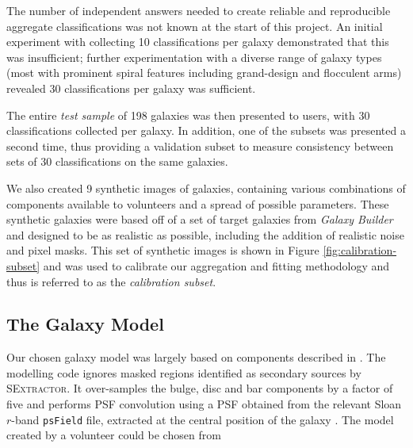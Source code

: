 \documentclass[main\.tex]{subfiles}
\begin{document}
The number of independent answers needed to create reliable and reproducible aggregate classifications was not known at the start of this project. An initial experiment with collecting 10 classifications per galaxy demonstrated that this was insufficient; further experimentation with a diverse range of galaxy types (most with prominent spiral features including grand-design and flocculent arms) revealed 30 classifications per galaxy was sufficient.

The entire {\it test sample} of 198 galaxies was then presented to users, with 30 classifications collected per galaxy. In addition, one of the subsets was presented a second time, thus providing a validation subset to measure consistency between sets of 30 classifications on the same galaxies.

We also created 9 synthetic images of galaxies, containing various combinations of components available to volunteers and a spread of possible parameters. These synthetic galaxies were based off of a set of target galaxies from \textit{Galaxy Builder} and designed to be as realistic as possible, including the addition of realistic noise and pixel masks. This set of synthetic images is shown in Figure \ref{fig:calibration-subset} and was used to calibrate our aggregation and fitting methodology and thus is referred to as the \textit{calibration subset}.

\begin{figure*}
  \caption{Arcsinh-stretched images of the synthetic galaxies present in the \textit{calibration subset}. These galaxies were designed to look as realistic as possible, while being described perfectly by the model available to volunteers.}
  \label{fig:calibration-subset}
\end{figure*}

\subsection{The Galaxy Model}
\label{section:galaxy-model}

Our chosen galaxy model was largely based on components described in \citet{galfit-paper}. The modelling code ignores masked regions identified as secondary sources by \textsc{SExtractor}. It over-samples the bulge, disc and bar components by a factor of five and performs PSF convolution using a PSF obtained from the relevant Sloan $r$-band \texttt{psField} file, extracted at the central position of the galaxy \citep{2002AJ....123..485S}. The model created by a volunteer could be chosen from
\end{document}
